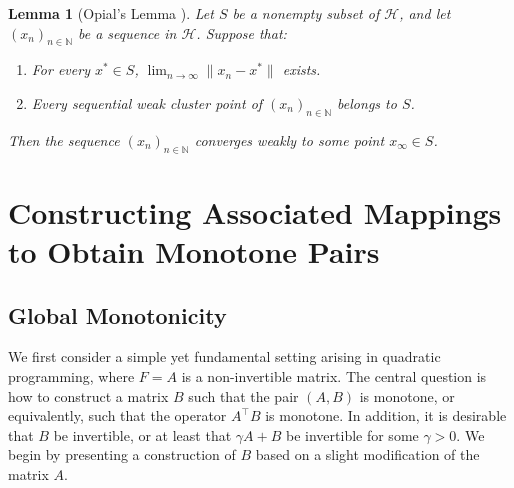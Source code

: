 \documentclass[11pt]{article}
\makeatletter
\renewenvironment{proof}[1][\proofname]{\par
	\normalfont
	\topsep0\p@\@plus3\p@ \trivlist
	\item[\hskip\labelsep\itshape
	#1\@addpunct{.}]\ignorespaces
}{%
	\qed\endtrivlist
}
\newtheorem{theorem}{Theorem}[section]
\newtheorem{lemma}[theorem]{Lemma}
\theoremstyle{definition}
\theoremstyle{definition}
\theoremstyle{definition}
\newcommand{\tcr}{\textcolor{red}}
\def\tcr{ \textcolor{red}}
\makeatother
\begin{document}
\begin{lemma}[Opial's Lemma {\cite{Opial}}]
	\label{l:Opial}
	Let \( S \) be a nonempty subset of \( \mathcal{H} \), and let \( (x_n)_{n \in \mathbb{N}} \) be a sequence in \( \mathcal{H} \). Suppose that:  
	\begin{enumerate}
		\item
		For every \( x^* \in S \), \(\displaystyle \lim_{n \to \infty} \|x_n - x^*\| \) exists.  
		\item
		Every sequential weak cluster point of \( (x_n)_{n \in \mathbb{N}} \) belongs to \( S \).  
	\end{enumerate}
	Then the sequence \( (x_n)_{n \in \mathbb{N}} \) converges weakly to some point \( x_\infty \in S \).  
\end{lemma}


\section{Constructing Associated Mappings to Obtain Monotone Pairs}
\subsection{Global Monotonicity}



{We first consider a simple yet fundamental setting arising in quadratic programming, where \(F=A\) is a non-invertible matrix. The central question is how to construct a matrix \(B\) such that the pair \((A,B)\) is monotone, or equivalently, such that the operator \(A^{\top}B\) is monotone. In addition, it is desirable that \(B\) be invertible, or at least that \(\gamma A+B\) be invertible for some \(\gamma>0\).
}
We begin by presenting a construction of \(B\) based on a slight modification of the matrix \(A\).
\end{document}
